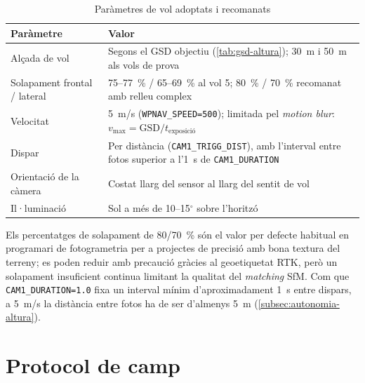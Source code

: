 \begin{table}[H]
    \centering
    \caption{Paràmetres de vol adoptats i recomanats}
    \label{tab:parametres-vol}
    \begin{tabular}{lP{9cm}}
        \toprule
        Paràmetre & Valor \\
        \midrule
        Alçada de vol & Segons el GSD objectiu (\cref{tab:gsd-altura}); 30~m i 50~m als vols de prova \\
        Solapament frontal / lateral & 75--77~\% / 65--69~\% al vol 5; 80~\% / 70~\% recomanat amb relleu complex \\
        Velocitat & 5~m/s (\texttt{WPNAV\_SPEED=500}); limitada pel \emph{motion blur}: $v_{\max} = \mathrm{GSD}/t_{\text{exposició}}$ \\
        Dispar & Per distància (\texttt{CAM1\_TRIGG\_DIST}), amb l'interval entre fotos superior a l'1~s de \texttt{CAM1\_DURATION} \\
        Orientació de la càmera & Costat llarg del sensor al llarg del sentit de vol \\
        Il·luminació & Sol a més de 10--15$^{\circ}$ sobre l'horitzó \\
        \bottomrule
    \end{tabular}
\end{table}

Els percentatges de solapament de 80/70~\% són el valor per defecte habitual en programari de fotogrametria per a projectes de precisió amb bona textura del terreny; es poden reduir amb precaució gràcies al geoetiquetat RTK, però un solapament insuficient continua limitant la qualitat del \emph{matching} SfM. Com que \texttt{CAM1\_DURATION=1.0} fixa un interval mínim d'aproximadament 1~s entre dispars, a 5~m/s la distància entre fotos ha de ser d'almenys 5~m (\cref{subsec:autonomia-altura}).

\section{Protocol de camp}
\label{sec:protocol-camp}

